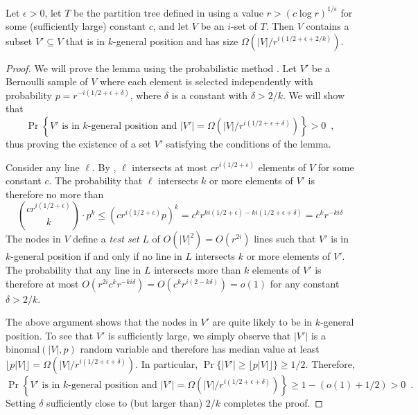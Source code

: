 \documentclass{patmorin}
\begin{document}
\begin{lem}
  Let $\epsilon > 0$, let $T$ be the partition tree defined in
   using a value $r>(c\log r)^{1/\epsilon}$ for
  some (sufficiently large) constant $c$, and let $V$ be an $i$-set of
  $T$.  Then $V$ contains a subset $V'\subseteq V$ that is in $k$-general
  position and has size $\Omega(|V|/r^{i(1/2+\epsilon + 2/k)})$.
\end{lem}

\begin{proof}
  We will prove the lemma using the probabilistic method \cite{as08}.
  Let $V'$ be a Bernoulli sample of $V$ where each element is selected
  independently with probability $p=r^{-i(1/2+\epsilon+\delta)}$, where $\delta$ is a constant with $\delta > 2/k$.
  We will show that
  \[
     \Pr\left\{
        \mbox{$V'$ is in $k$-general position 
          and $|V'|=\Omega(|V|/r^{i(1/2+\epsilon+\delta)})$}
      \right\} > 0 \enspace ,
  \]
  thus proving the existence of a set $V'$ satisfying the conditions of
  the lemma.

  Consider any line $\ell$. By , $\ell$
  intersects at most $cr^{i(1/2+\epsilon)}$ elements of $V$ for some
  constant $c$. The probability that $\ell$ intersects $k$ or more
  elements of $V'$ is therefore no more than
  \[
    \binom{cr^{i(1/2+\epsilon)}}{k}\cdot p^k
    \le (cr^{i(1/2+\epsilon)}p)^k
    = c^kr^{ki(1/2+\epsilon)-ki(1/2+\epsilon+\delta)}
    = c^kr^{-ki\delta}
  \]
  The nodes in $V$ define a \emph{test set} $L$ of $O(|V|^2)=O(r^{2i})$
  lines such that $V'$ is in $k$-general position if and only if no line
  in $L$ intersects $k$ or more elements of $V'$.   The probability that
  any line in $L$ intersects more than $k$ elements of $V'$ is therefore
  at most $O(r^{2i}c^kr^{-ki\delta})=O(c^kr^{i(2-k\delta)})=o(1)$ for any
  constant $\delta > 2/k$.

  The above argument shows that the nodes in $V'$ are quite likely
  to be in $k$-general position.  To see that $V'$ is sufficiently
  large, we simply observe that $|V'|$ is a $\mathrm{binomal}(|V|,p)$
  random variable and therefore has median value at least
  $\lfloor{p|V|}\rfloor=\Omega(|V|/r^{i(1/2+\epsilon + \delta)})$.
  In particular, $\Pr\{|V'|\ge \lfloor{p|V|}\rfloor\}\ge 1/2$.  Therefore,
  \[
     \Pr\left\{
        \mbox{$V'$ is in $k$-general position 
          and $|V'|=\Omega(|V|/r^{i(1/2+\epsilon+\delta)})$}
      \right\} \ge 1- (o(1) + 1/2) > 0 \enspace .
  \]
  Setting $\delta$ sufficiently close to (but larger than) $2/k$ completes
  the proof.
\end{proof}
\end{document}
